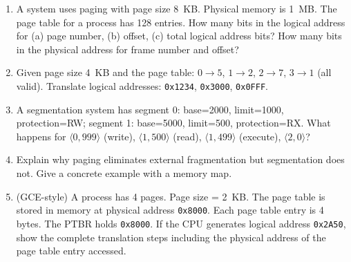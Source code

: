 \documentclass[11pt]{article}
\begin{document}
\begin{exercice}
\begin{enumerate}
    \item A system uses paging with page size \SI{8}{KB}. Physical memory is \SI{1}{MB}. The page table for a process has 128 entries. How many bits in the logical address for (a) page number, (b) offset, (c) total logical address bits? How many bits in the physical address for frame number and offset?
    \item Given page size \SI{4}{KB} and the page table: $0\to5$, $1\to2$, $2\to7$, $3\to1$ (all valid). Translate logical addresses: \texttt{0x1234}, \texttt{0x3000}, \texttt{0x0FFF}.
    \item A segmentation system has segment 0: base=2000, limit=1000, protection=RW; segment 1: base=5000, limit=500, protection=RX. What happens for $\langle 0, 999 \rangle$ (write), $\langle 1, 500 \rangle$ (read), $\langle 1, 499 \rangle$ (execute), $\langle 2, 0 \rangle$?
    \item Explain why paging eliminates external fragmentation but segmentation does not. Give a concrete example with a memory map.
    \item (GCE-style) A process has 4 pages. Page size = \SI{2}{KB}. The page table is stored in memory at physical address \texttt{0x8000}. Each page table entry is 4 bytes. The PTBR holds \texttt{0x8000}. If the CPU generates logical address \texttt{0x2A50}, show the complete translation steps including the physical address of the page table entry accessed.
\end{enumerate}
\end{exercice}
\end{document}
